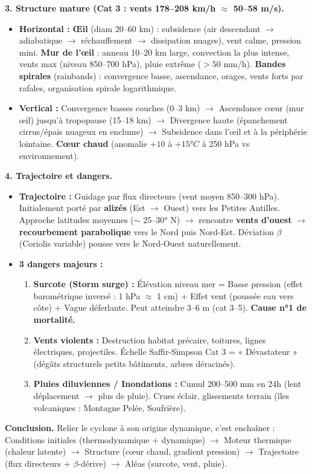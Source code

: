 \documentclass[11pt]{article}
\begin{document}
\begin{exoresolu}
\textbf{3. Structure mature (Cat 3 : vents 178--208 km/h $\approx$ 50--58 m/s).}
\begin{itemize}
    \item \textbf{Horizontal :} \textbf{Œil} (diam 20--60 km) : subsidence (air descendant $\to$ adiabatique $\to$ réchauffement $\to$ dissipation nuages), vent calme, pression mini. \textbf{Mur de l'œil} : anneau 10--20 km large, convection la plus intense, vents max (niveau 850--700 hPa), pluie extrême ($> 50$ mm/h). \textbf{Bandes spirales} (rainbands) : convergence basse, ascendance, orages, vents forts par rafales, organisation spirale logarithmique.
    \item \textbf{Vertical :} Convergence basses couches (0--3 km) $\to$ Ascendance cœur (mur œil) jusqu'à tropopause (15--18 km) $\to$ Divergence haute (épanchement cirrus/épais nuageux en enclume) $\to$ Subsidence dans l'œil et à la périphérie lointaine. \textbf{Cœur chaud} (anomalie $+10$ à $+15°C$ à 250 hPa vs environnement).
\end{itemize}

\textbf{4. Trajectoire et dangers.}
\begin{itemize}
    \item \textbf{Trajectoire :} Guidage par flux directeurs (vent moyen 850--300 hPa). Initialement porté par \textbf{alizés} (Est $\to$ Ouest) vers les Petites Antilles. Approche latitudes moyennes ($\sim$ 25--30° N) $\to$ rencontre \textbf{vents d'ouest} $\to$ \textbf{recourbement parabolique} vers le Nord puis Nord-Est. Déviation $\beta$ (Coriolis variable) pousse vers le Nord-Ouest naturellement.
    \item \textbf{3 dangers majeurs :}
    \begin{enumerate}
        \item \textbf{Surcote (Storm surge) :} Élévation niveau mer = Basse pression (effet barométrique inversé : 1 hPa $\approx$ 1 cm) + Effet vent (poussée eau vers côte) + Vague déferlante. Peut atteindre 3--6 m (cat 3--5). \textbf{Cause n°1 de mortalité.}
        \item \textbf{Vents violents :} Destruction habitat précaire, toitures, lignes électriques, projectiles. Échelle Saffir-Simpson Cat 3 = « Dévastateur » (dégâts structurels petits bâtiments, arbres déracinés).
        \item \textbf{Pluies diluviennes / Inondations :} Cumul 200--500 mm en 24h (lent déplacement $\to$ plus de pluie). Crues éclair, glissements terrain (îles volcaniques : Montagne Pelée, Soufrière).
    \end{enumerate}
\end{itemize}

\textbf{Conclusion.} Relier le cyclone à son origine dynamique, c'est enchaîner : Conditions initiales (thermodynamique + dynamique) $\to$ Moteur thermique (chaleur latente) $\to$ Structure (cœur chaud, gradient pression) $\to$ Trajectoire (flux directeurs + $\beta$-dérive) $\to$ Aléas (surcote, vent, pluie).
\end{exoresolu}
\end{document}
